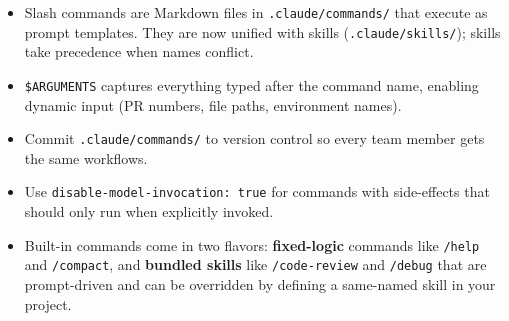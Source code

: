 \begin{summarybox}
\begin{itemize}
  \item Slash commands are Markdown files in \texttt{.claude/commands/}
        that execute as prompt templates. They are now unified with skills
        (\texttt{.claude/skills/}); skills take precedence when names
        conflict.
  \item \texttt{\$ARGUMENTS} captures everything typed after the command
        name, enabling dynamic input (PR numbers, file paths, environment
        names).
  \item Commit \texttt{.claude/commands/} to version control so every team
        member gets the same workflows.
  \item Use \texttt{disable-model-invocation: true} for commands with
        side-effects that should only run when explicitly invoked.
  \item Built-in commands come in two flavors: \textbf{fixed-logic}
        commands like \texttt{/help} and \texttt{/compact}, and
        \textbf{bundled skills} like \texttt{/code-review} and
        \texttt{/debug} that are prompt-driven and can be overridden by
        defining a same-named skill in your project.
\end{itemize}
\end{summarybox}

\nocite{*}
\printbibliography[heading=subbibliography,title={References}]
